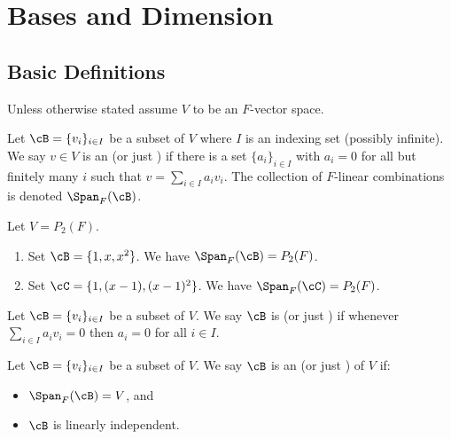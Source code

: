 \chapter{Bases and Dimension}\label{chapter:bases-and-dimension}

\vspace{12pt}
\section{Basic Definitions}\label{sec:basic-definitions}
    Unless otherwise stated assume $V$ to be an $F$-vector space.
    \begin{definition}
        Let $\cB = \{v_i\}_{i \in I}$ be a subset of $V$ where $I$ is an indexing set (possibly infinite). We say $v \in V$ is an  (or just ) if there is a set $\{a_i\}_{i \in I}$ with $a_i = 0$ for all but finitely many $i$ such that $v = \sum_{i \in I}a_i v_i$. The collection of $F$-linear combinations is denoted $\Span_F{(\cB)}$.
    \end{definition}

    \begin{example}
        Let $V = P_2(F)$.
        \begin{enumerate}[label = (\arabic*)]
            \item Set $\cB = \{1,x,x^2\}$. We have $\Span_F{(\cB)} = P_2(F)$.
            \item Set $\cC = \{1,(x-1),(x-1)^2\}$. We have $\Span_F{(\cC)} = P_2(F)$. 
        \end{enumerate}
    \end{example}

    \begin{definition}
        Let $\cB = \{v_i\}_{i \in I}$ be a subset of $V$. We say $\cB$ is  (or just ) if whenever $\sum_{i \in I}a_i v_i = 0$ then $a_i = 0$ for all $i \in I$.
    \end{definition}

    \begin{definition}
        Let $\cB = \{v_i\}_{i \in I}$ be a subset of $V$. We say $\cB$ is an  (or just ) of $V$ if:
            \begin{itemize}
                \item $\Span_F{(\cB)} = V$, and
                \item $\cB$ is linearly independent.
            \end{itemize}
    \end{definition}

